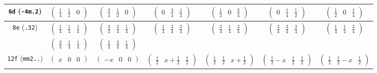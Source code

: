 \documentclass[fleqn,9pt,landscape]{jsarticle}
\begin{document}
\begin{center}
\begin{longtable}{ccccccc}
{\tt 6d} ({\tt -4m.2}) & $ \begin{pmatrix} \frac{1}{4} & \frac{1}{2} & 0 \end{pmatrix} $ & $ \begin{pmatrix} \frac{3}{4} & \frac{1}{2} & 0 \end{pmatrix} $ & $ \begin{pmatrix} 0 & \frac{3}{4} & \frac{1}{2} \end{pmatrix} $ & $ \begin{pmatrix} \frac{1}{2} & 0 & \frac{3}{4} \end{pmatrix} $ & $ \begin{pmatrix} 0 & \frac{1}{4} & \frac{1}{2} \end{pmatrix} $ & $ \begin{pmatrix} \frac{1}{2} & 0 & \frac{1}{4} \end{pmatrix} $ \\ \hline
{\tt 8e} ({\tt .32}) & $ \begin{pmatrix} \frac{1}{4} & \frac{1}{4} & \frac{1}{4} \end{pmatrix} $ & $ \begin{pmatrix} \frac{3}{4} & \frac{3}{4} & \frac{1}{4} \end{pmatrix} $ & $ \begin{pmatrix} \frac{1}{4} & \frac{3}{4} & \frac{3}{4} \end{pmatrix} $ & $ \begin{pmatrix} \frac{3}{4} & \frac{1}{4} & \frac{3}{4} \end{pmatrix} $ & $ \begin{pmatrix} \frac{3}{4} & \frac{3}{4} & \frac{3}{4} \end{pmatrix} $ & $ \begin{pmatrix} \frac{1}{4} & \frac{1}{4} & \frac{3}{4} \end{pmatrix} $ \\
& $ \begin{pmatrix} \frac{3}{4} & \frac{1}{4} & \frac{1}{4} \end{pmatrix} $ & $ \begin{pmatrix} \frac{1}{4} & \frac{3}{4} & \frac{1}{4} \end{pmatrix} $ & $  $ & $  $ & $  $ & $  $ \\ \hline
{\tt 12f} ({\tt mm2..}) & $ \begin{pmatrix} x & 0 & 0 \end{pmatrix} $ & $ \begin{pmatrix} - x & 0 & 0 \end{pmatrix} $ & $ \begin{pmatrix} \frac{1}{2} & x + \frac{1}{2} & \frac{1}{2} \end{pmatrix} $ & $ \begin{pmatrix} \frac{1}{2} & \frac{1}{2} & x + \frac{1}{2} \end{pmatrix} $ & $ \begin{pmatrix} \frac{1}{2} - x & \frac{1}{2} & \frac{1}{2} \end{pmatrix} $ & $ \begin{pmatrix} \frac{1}{2} & \frac{1}{2} - x & \frac{1}{2} \end{pmatrix} $ \\

\end{longtable}
\end{center}
\end{document}
